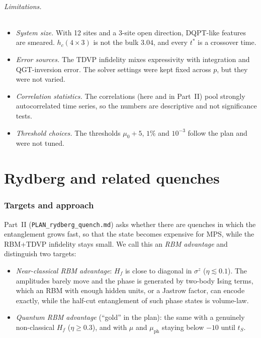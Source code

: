 \documentclass[11pt,a4paper]{article}
\begin{document}
\paragraph{Limitations.}
\begin{itemize}
  \item \emph{System size.} With 12 sites and a 3-site open direction, DQPT-like features are
    smeared. $h_c(4\times3)$ is not the bulk $3.04$, and every $t^*$ is a crossover time.
  \item \emph{Error sources.} The TDVP infidelity mixes expressivity with integration and
    QGT-inversion error. The solver settings were kept fixed across $p$, but they were not varied.
  \item \emph{Correlation statistics.} The correlations (here and in Part~II) pool strongly autocorrelated time
    series, so the numbers are descriptive and not significance tests.
  \item \emph{Threshold choices.} The thresholds $\mu_0+5$, $1\%$ and $10^{-3}$ follow the plan and
    were not tuned.
\end{itemize}

\FloatBarrier
\part{Rydberg and related quenches}

\section{Targets and approach}
\label{sec:ryd}

Part~II (\texttt{PLAN\_rydberg\_quench.md}) asks whether there are quenches in which the entanglement grows fast, so
that the state becomes expensive for MPS, while the RBM+TDVP infidelity stays small. We call this an \emph{RBM
advantage} and distinguish two targets:
\begin{itemize}
  \item \emph{Near-classical RBM advantage}: $H_f$ is close to diagonal in $\sigma^z$ ($\eta\lesssim0.1$). The
    amplitudes barely move and the phase is generated by two-body Ising terms, which an RBM with enough hidden units,
    or a Jastrow factor, can encode exactly, while the half-cut entanglement of such phase states is volume-law.
  \item \emph{Quantum RBM advantage} (``gold'' in the plan): the same with a genuinely non-classical $H_f$
    ($\eta\ge0.3$), and with $\mu$ and $\mu_{\mathrm{ph}}$ staying below $-10$ until $t_S$.
\end{itemize}
\end{document}
